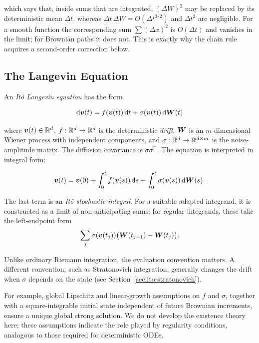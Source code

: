which says that, inside sums that are integrated, $(\Delta W)^2$ may be replaced by its deterministic mean $\Delta t$, whereas 
$\Delta t\,\Delta W=O(\Delta t^{3/2})$ and $\Delta t^2$ are negligible. For a smooth function the corresponding sum $\sum(\Delta x)^2$ is 
$O(\Delta t)$ and vanishes in the limit; for Brownian paths it does not. This is exactly why the chain rule acquires a second-order correction 
below.

\subsection{The Langevin Equation}

\begin{definition}
\label{def:langevin-equation}
An \emph{It\^o Langevin equation} has the form 

\[
\mathrm{d}\bm{v}(t)=f(\bm{v}(t))\,\mathrm{d} t+\sigma(\bm{v}(t))\,\mathrm{d}\bm{W}(t)
\]

where $\bm{v}(t)\in\mathbb{R}^d$, $f:\mathbb{R}^d\to\mathbb{R}^d$ is the deterministic \emph{drift}, $\bm{W}$ is an $m$-dimensional Wiener process with independent components, and $\sigma:\mathbb{R}^d\to\mathbb{R}^{d\times m}$ is the noise-amplitude matrix. The diffusion covariance is $\sigma\sigma^{\top}$. The equation is interpreted in integral form:

\begin{equation}
\bm{v}(t)=\bm{v}(0)+\int_0^t f(\bm{v}(s))\,\mathrm{d} s
+\int_0^t\sigma(\bm{v}(s))\,\mathrm{d}\bm{W}(s).
\end{equation}

The last term is an \emph{It\^o stochastic integral}. For a suitable adapted integrand, it is constructed as a limit of non-anticipating sums; for regular integrands, these take the left-endpoint form
\[
\sum_j\sigma(\bm{v}(t_j))\big(\bm{W}(t_{j+1})-\bm{W}(t_j)\big).
\]

Unlike ordinary Riemann integration, the evaluation convention matters. A different convention, such as Stratonovich integration, generally changes the drift when $\sigma$ depends on the state (see Section~\ref{sec:ito-stratonovich}).
\end{definition}

For example, global Lipschitz and linear-growth assumptions on $f$ and $\sigma$, together with a square-integrable initial state independent of future Brownian increments, ensure a unique global strong solution. We do not develop the existence theory here; these assumptions indicate the role played by regularity conditions, analogous to those required for deterministic ODEs.

